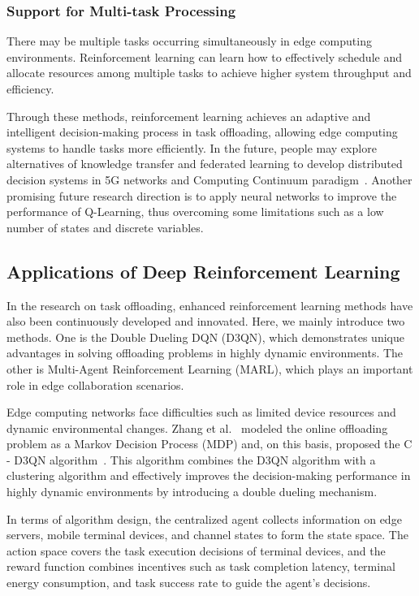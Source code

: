 \documentclass[journal]{IEEEtran}
\begin{document}
\subsubsection{Support for Multi-task Processing}
There may be multiple tasks occurring simultaneously in edge computing environments. Reinforcement learning can learn how to effectively schedule and allocate resources among multiple tasks to achieve higher system throughput and efficiency.

Through these methods, reinforcement learning achieves an adaptive and intelligent decision-making process in task offloading, allowing edge computing systems to handle tasks more efficiently. In the future, people may explore alternatives of knowledge transfer and federated learning to develop distributed decision systems in 5G networks and Computing Continuum paradigm~\cite{pyyz008}. Another promising future research direction is to apply neural networks to improve the performance of Q-Learning, thus overcoming some limitations such as a low number of states and discrete variables.

\subsection{Applications of Deep Reinforcement Learning}

In the research on task offloading, enhanced reinforcement learning methods have also been continuously developed and innovated. Here, we mainly introduce two methods. One is the Double Dueling DQN (D3QN), which demonstrates unique advantages in solving offloading problems in highly dynamic environments. The other is Multi-Agent Reinforcement Learning (MARL), which plays an important role in edge collaboration scenarios.

Edge computing networks face difficulties such as limited device resources and dynamic environmental changes. 
Zhang et al.~\cite{zheng07} modeled the online offloading problem as a Markov Decision Process (MDP) and, 
on this basis, proposed the C - D3QN algorithm~\cite{zheng07}. 
This algorithm combines the D3QN algorithm with a clustering algorithm and effectively improves the 
decision-making performance in highly dynamic environments by introducing a double dueling mechanism.

In terms of algorithm design, the centralized agent collects information on edge servers, mobile terminal devices, and channel states to form the state space. The action space covers the task execution decisions of terminal devices, and the reward function combines incentives such as task completion latency, terminal energy consumption, and task success rate to guide the agent's decisions.
\end{document}
